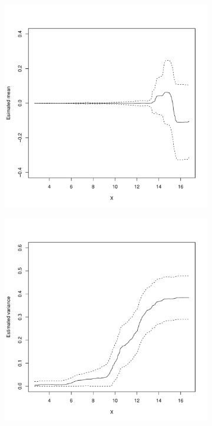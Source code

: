 \documentclass[12pt]{article}
\begin{document}
\begin{figure}[h]
    \begin{subfigure}[b]{0.4\textwidth}
        \centering
        \includegraphics[width=\textwidth]{figures_treasury_c.pdf}
        \caption{}
        \label{fig:tb_mean}
    \end{subfigure}
    \hfill
    \begin{subfigure}[b]{0.4\textwidth}
        \centering
        \includegraphics[width=\textwidth]{figures_treasury_d.pdf}

\end{subfigure}
\end{figure}
\end{document}
